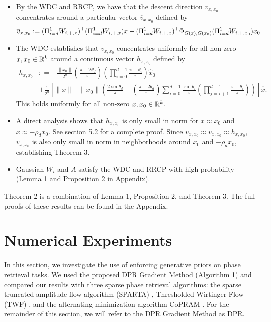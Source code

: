 \documentclass{article}
\begin{document}
\begin{itemize}
\item By the WDC and RRCP, we have that the descent direction $v_{x,x_0}$ concentrates around a particular vector $\overline{v}_{x,x_0}$ defined by \begin{align*}
\overline{v}_{x,x_0} & := (\Pi_{i=d}^1 W_{i,+,x})^\top(\Pi_{i=d}^1 W_{i,+,x})x - (\Pi_{i=d}^1 W_{i,+,x})^\top \Phi_{G(x),G(x_0)} (\Pi_{i=d}^1 W_{i,+,x_0})x_0. 
\end{align*}
\item The WDC establishes that $\overline{v}_{x,x_0}$ concentrates uniformly for all non-zero $x,x_0 \in \mathbb{R}^k$ around a continuous vector $h_{x,x_0}$ defined by \begin{align*}
h_{x,x_0} & : = - \frac{\|x_0\|}{2^d}\left(\frac{\pi - 2\overline{\theta}_d}{\pi}\right)\left(\prod_{i=0}^{d-1}\frac{\pi - \overline{\theta}_i}{\pi}\right)\hat{x}_0 \\
& + \frac{1}{2^d}\left[\|x\| - \|x_0\|\left( \frac{2\sin \overline{\theta}_d}{\pi} - \left(\frac{\pi - 2\overline{\theta}_d}{\pi}\right) \sum_{i=0}^{d-1} \frac{\sin \overline{\theta}_i}{\pi}\left(\prod_{j=i+1}^{d-1} \frac{\pi - \overline{\theta}_i}{\pi}\right)\right)\right]\hat{x}.
\end{align*}
This holds uniformly for all non-zero $x,x_0 \in \mathbb{R}^k$.
\item A direct analysis shows that $h_{x,x_0}$ is only small in norm for $x \approx x_0$ and $x \approx -\rho_d x_0$. See section 5.2 for a complete proof. Since $v_{x,x_0} \approx \overline{v}_{x,x_0} \approx h_{x,x_0}$, $v_{x,x_0}$ is also only small in norm in neighborhoods around $x_0$ and $-\rho_d x_0$, establishing Theorem 3.
\item Gaussian $W_i$ and $A$ satisfy the WDC and RRCP with high probability (Lemma 1 and Proposition 2 in Appendix). 
\end{itemize}

Theorem 2 is a combination of Lemma 1, Proposition 2, and Theorem 3. The full proofs of these results can be found in the Appendix.

\section{Numerical Experiments}
In this section, we investigate the use of enforcing generative priors on phase retrieval tasks. We used the proposed DPR Gradient Method (Algorithm 1) and compared our results with three sparse phase retrieval algorithms: the sparse truncated amplitude flow algorithm (SPARTA) \cite{SPARTA}, Thresholded Wirtinger Flow (TWF) \cite{Cai2016}, and the alternating minimization algorithm CoPRAM \cite{Hedge2017}. For the remainder of this section, we will refer to the DPR Gradient Method as DPR.
\end{document}
